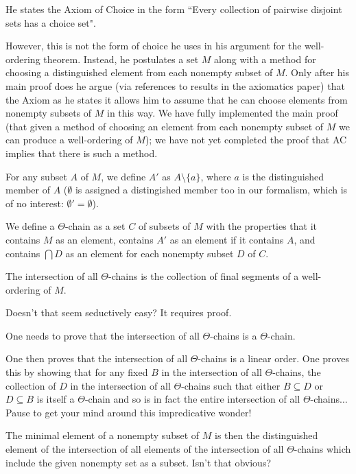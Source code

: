 \documentclass{slides}
\begin{document}
\begin{slide}

He states the Axiom of Choice in the form ``Every collection of pairwise disjoint sets has a choice set".

However, this is not the form of choice he uses in his argument for the well-ordering theorem.  Instead, he postulates a set $M$ along with a method for choosing a distinguished element from each nonempty subset of $M$.  Only after his main proof does he argue (via references to results in the axiomatics paper) that the Axiom as he states it allows him to assume that he
can choose elements from nonempty subsets of $M$ in this way.  We have fully implemented the main proof (that given a method of choosing an element from each nonempty subset of
$M$ we can produce a well-ordering of $M$);  we have not yet completed the proof that AC implies that there is such a method.


\end{slide}

\begin{slide}

For any subset $A$ of $M$, we define $A'$ as $A \setminus \{a\}$, where $a$ is the distinguished member of $A$ ($\emptyset$ is assigned a distingished member too in our formalism, which is of no interest:  $\emptyset'=\emptyset$).

We define a $\Theta$-chain as a set $C$ of subsets of $M$ with the properties that it contains $M$ as an element,  contains $A'$ as an element  if it contains $A$, and contains $\bigcap D$ as an element for each nonempty subset $D$ of $C$.

The intersection of all $\Theta$-chains is the collection of final segments of a well-ordering of $M$.

\end{slide}

\begin{slide}

Doesn't that seem seductively easy?  It requires proof.

One needs to prove that the intersection of all $\Theta$-chains is a $\Theta$-chain.

One then proves that the intersection of all $\Theta$-chains is a linear order.  One proves this by showing that for any fixed $B$ in the intersection of all $\Theta$-chains, the collection of $D$ in the intersection of all $\Theta$-chains such that either $B \subseteq D$ or $D \subseteq B$ is itself a $\Theta$-chain and so is in fact the entire intersection of all $\Theta$-chains$\ldots$  Pause to get your mind around this impredicative wonder!

The minimal element of a nonempty subset of $M$ is then the distinguished element of the intersection of all elements of the intersection of all $\Theta$-chains which include
the given nonempty set as a subset.  Isn't that obvious?

\end{slide}
\end{document}
